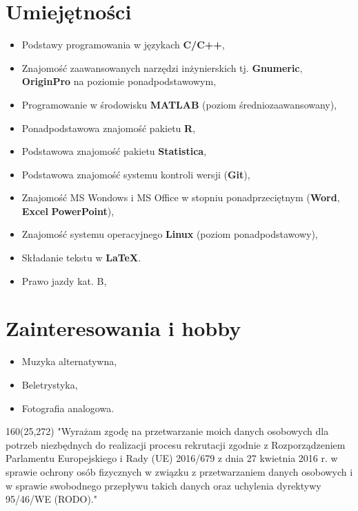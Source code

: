 \documentclass[10pt, a4paper, sans]{moderncv}   %
\begin{document}
\section{Umiejętności}
{\begin{itemize}
	\item Podstawy programowania w językach \textbf{C/C++}, 
	\item Znajomość zaawansowanych narzędzi inżynierskich tj. \textbf{Gnumeric}, \textbf{OriginPro} na poziomie ponadpodstawowym,
	\item Programowanie w środowisku \textbf{MATLAB} (poziom średniozaawansowany),
    \item Ponadpodstawowa znajomość pakietu \textbf{R},
    \item Podstawowa znajomość pakietu \textbf{Statistica},
    \item Podstawowa znajomość systemu kontroli wersji (\textbf{Git}),
	\item Znajomość MS Wondows i MS Office w stopniu ponadprzeciętnym (\textbf{Word}, \textbf{Excel} \textbf{PowerPoint}),
	\item Znajomość systemu operacyjnego \textbf{Linux} (poziom ponadpodstawowy),
	\item Składanie tekstu w \textbf{\LaTeX}.
	\item Prawo jazdy kat. B,
\end{itemize}}



\section{Zainteresowania i hobby}
{\begin{itemize}
\item Muzyka alternatywna,
\item Beletrystyka,
\item Fotografia analogowa.

\end{itemize}}

\begin{textblock}{160}(25,272)
\noindent "Wyrażam zgodę na przetwarzanie moich danych osobowych dla potrzeb niezbędnych do realizacji procesu rekrutacji zgodnie z Rozporządzeniem Parlamentu Europejskiego i Rady (UE) 2016/679 z dnia 27 kwietnia 2016 r. w sprawie ochrony osób fizycznych w związku z przetwarzaniem danych osobowych i w sprawie swobodnego przepływu takich danych oraz uchylenia dyrektywy 95/46/WE (RODO)."

\end{textblock}
\end{document}

